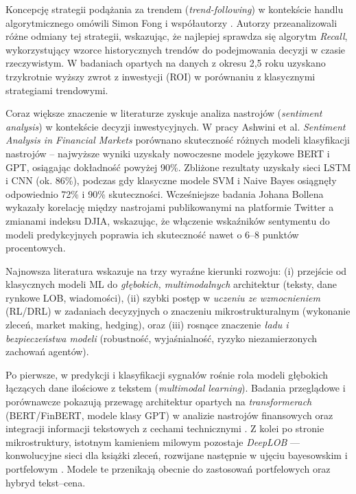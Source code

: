 Koncepcję strategii podążania za trendem (\emph{trend-following}) w kontekście handlu algorytmicznego omówili Simon Fong i współautorzy \parencite{fong2012}. Autorzy przeanalizowali różne odmiany tej strategii, wskazując, że najlepiej sprawdza się algorytm \emph{Recall}, wykorzystujący wzorce historycznych trendów do podejmowania decyzji w czasie rzeczywistym. W badaniach opartych na danych z okresu 2,5 roku uzyskano trzykrotnie wyższy zwrot z inwestycji (ROI) w porównaniu z klasycznymi strategiami trendowymi.

Coraz większe znaczenie w literaturze zyskuje analiza nastrojów (\emph{sentiment analysis}) w kontekście decyzji inwestycyjnych. W pracy Ashwini et al. \textit{Sentiment Analysis in Financial Markets} \parencite{ashwini2024} porównano skuteczność różnych modeli klasyfikacji nastrojów – najwyższe wyniki uzyskały nowoczesne modele językowe BERT i GPT, osiągając dokładność powyżej 90\%. Zbliżone rezultaty uzyskały sieci LSTM i CNN (ok. 86\%), podczas gdy klasyczne modele SVM i Naive Bayes osiągnęły odpowiednio 72\% i 90\% skuteczności. Wcześniejsze badania Johana Bollena \parencite{bollen2011} wykazały korelację między nastrojami publikowanymi na platformie Twitter a zmianami indeksu DJIA, wskazując, że włączenie wskaźników sentymentu do modeli predykcyjnych poprawia ich skuteczność nawet o 6–8 punktów procentowych.

Najnowsza literatura wskazuje na trzy wyraźne kierunki rozwoju: (i) przejście od klasycznych modeli ML do \emph{głębokich, multimodalnych} architektur (teksty, dane rynkowe LOB, wiadomości), (ii) szybki postęp w \emph{uczeniu ze wzmocnieniem} (RL/DRL) w zadaniach decyzyjnych o znaczeniu mikrostrukturalnym (wykonanie zleceń, market making, hedging), oraz (iii) rosnące znaczenie \emph{ładu i bezpieczeństwa modeli} (robustność, wyjaśnialność, ryzyko niezamierzonych zachowań agentów).

Po pierwsze, w predykcji i klasyfikacji sygnałów rośnie rola modeli głębokich łączących dane ilościowe z tekstem (\emph{multimodal learning}). Badania przeglądowe i porównawcze pokazują przewagę architektur opartych na \emph{transformerach} (BERT/FinBERT, modele klasy GPT) w analizie nastrojów finansowych oraz integracji informacji tekstowych z cechami technicznymi \parencite{zexin2021, nasiopoulos2025, kang2025}. Z kolei po stronie mikrostruktury, istotnym kamieniem milowym pozostaje \emph{DeepLOB} — konwolucyjne sieci dla książki zleceń, rozwijane następnie w ujęciu bayesowskim i portfelowym \parencite{zhang2019}. Modele te przenikają obecnie do zastosowań portfelowych oraz hybryd tekst–cena.


